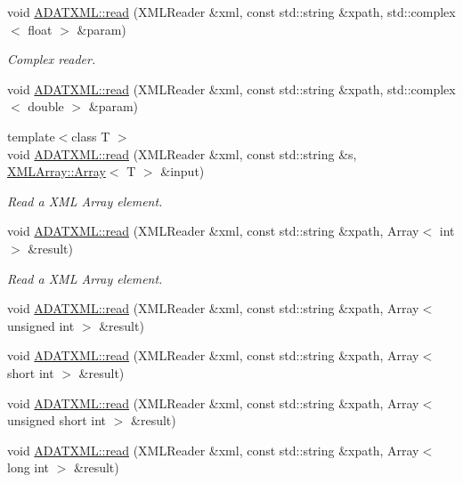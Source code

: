 \begin{DoxyCompactItemize}
\item 
void \mbox{\hyperlink{group__io_ga1287217ff7c9cbae6a6c958ee2de7776}{A\+D\+A\+T\+X\+M\+L\+::read}} (X\+M\+L\+Reader \&xml, const std\+::string \&xpath, std\+::complex$<$ float $>$ \&param)
\begin{DoxyCompactList}\small\item\em Complex reader. \end{DoxyCompactList}\item 
void \mbox{\hyperlink{group__io_gaf79f2861a8d55a3e88311959e646b0e1}{A\+D\+A\+T\+X\+M\+L\+::read}} (X\+M\+L\+Reader \&xml, const std\+::string \&xpath, std\+::complex$<$ double $>$ \&param)
\item 
{\footnotesize template$<$class T $>$ }\\void \mbox{\hyperlink{group__io_gae46a9532d6b16b2a3dc58d889eb1d688}{A\+D\+A\+T\+X\+M\+L\+::read}} (X\+M\+L\+Reader \&xml, const std\+::string \&s, \mbox{\hyperlink{classXMLArray_1_1Array}{X\+M\+L\+Array\+::\+Array}}$<$ T $>$ \&input)
\begin{DoxyCompactList}\small\item\em Read a X\+ML Array element. \end{DoxyCompactList}\item 
void \mbox{\hyperlink{group__io_gaeaed8077b8bee4f4277ea0cc8cc13744}{A\+D\+A\+T\+X\+M\+L\+::read}} (X\+M\+L\+Reader \&xml, const std\+::string \&xpath, Array$<$ int $>$ \&result)
\begin{DoxyCompactList}\small\item\em Read a X\+ML Array element. \end{DoxyCompactList}\item 
void \mbox{\hyperlink{group__io_ga2eaf76c05e59884bd34813884eef708b}{A\+D\+A\+T\+X\+M\+L\+::read}} (X\+M\+L\+Reader \&xml, const std\+::string \&xpath, Array$<$ unsigned int $>$ \&result)
\item 
void \mbox{\hyperlink{group__io_gaa9246e7914f16a84371b00a4910a535a}{A\+D\+A\+T\+X\+M\+L\+::read}} (X\+M\+L\+Reader \&xml, const std\+::string \&xpath, Array$<$ short int $>$ \&result)
\item 
void \mbox{\hyperlink{group__io_ga778f9eca273d2180afff1ba58606a153}{A\+D\+A\+T\+X\+M\+L\+::read}} (X\+M\+L\+Reader \&xml, const std\+::string \&xpath, Array$<$ unsigned short int $>$ \&result)
\item 
void \mbox{\hyperlink{group__io_ga28f3bc5eedbefea7d81064c339e72f97}{A\+D\+A\+T\+X\+M\+L\+::read}} (X\+M\+L\+Reader \&xml, const std\+::string \&xpath, Array$<$ long int $>$ \&result)

\end{DoxyCompactItemize}
